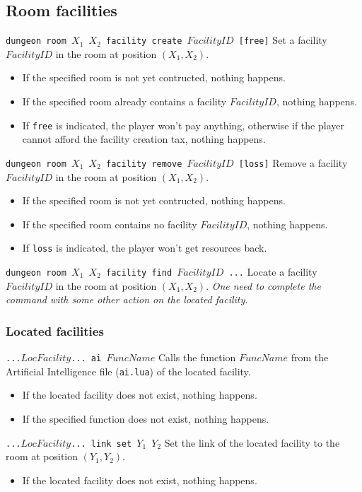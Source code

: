 \documentclass[10pt,a4paper]{scrartcl}
\newenvironment{apiCode}[1]
{ \begin{lrbox}{\mybox} \begin{minipage}{0.9\textwidth} {\color{Mahogany} \small\texttt{#1}} \vspace{8pt} \newline }
{ \end{minipage} \end{lrbox}\fbox{\usebox{\mybox}} \newline\vspace{4pt}\newline }
\begin{document}
\subsection{Room facilities}
\begin{apiCode}{dungeon room $X_1$ $X_2$ facility create $FacilityID$ [free]}
Set a facility $FacilityID$ in the room at position $(X_1, X_2)$.
\begin{itemize}
\itemsep 0em
\item If the specified room is not yet contructed, nothing happens.
\item If the specified room already contains a facility $FacilityID$, nothing happens.
\item If \verb#free# is indicated, the player won't pay anything,\newline
	  otherwise if the player cannot afford the facility creation tax, nothing happens.
\end{itemize}
\end{apiCode}
\begin{apiCode}{dungeon room $X_1$ $X_2$ facility remove $FacilityID$ [loss]}
Remove a facility $FacilityID$ in the room at position $(X_1, X_2)$.
\begin{itemize}
\itemsep 0em
\item If the specified room is not yet contructed, nothing happens.
\item If the specified room contains no facility $FacilityID$, nothing happens.
\item If \verb#loss# is indicated, the player won't get resources back.
\end{itemize}
\end{apiCode}
\begin{apiCode}{dungeon room $X_1$ $X_2$ facility find $FacilityID$ ...}
Locate a facility $FacilityID$ in the room at position $(X_1, X_2)$.\newline
\textit{One need to complete the command with some other action on the located facility.}
\end{apiCode}

\subsubsection*{Located facilities}
\begin{apiCode}{...$LocFacility$... ai $FuncName$}
Calls the function $FuncName$ from the Artificial Intelligence file (\texttt{ai.lua}) of the located facility.
\begin{itemize}
\itemsep 0em
\item If the located facility does not exist, nothing happens.
\item If the specified function does not exist, nothing happens.
\end{itemize}
\end{apiCode}
\begin{apiCode}{...$LocFacility$... link set $Y_1$ $Y_2$}
Set the link of the located facility to the room at position $(Y_1, Y_2)$.
\begin{itemize}
\itemsep 0em
\item If the located facility does not exist, nothing happens.
\end{itemize}
\end{apiCode}
\end{document}
